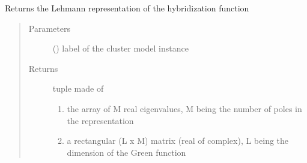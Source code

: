 \documentclass[letterpaper,10pt,english]{sphinxmanual}
\begin{document}

\begin{fulllineitems}
\label{\detokenize{functions:pyqcm.hybridization_Lehmann}}
\sphinxAtStartPar
Returns the Lehmann representation of the hybridization function
\begin{quote}\begin{description}
\item[{Parameters}] \leavevmode
\sphinxAtStartPar
{} () \textendash{} label of the cluster model instance

\item[{Returns}] \leavevmode
\sphinxAtStartPar

\sphinxhyphen{}tuple made of
\begin{enumerate}
%
\item {} 
\sphinxAtStartPar
the array of M real eigenvalues, M being the number of poles in the representation

\item {} 
\sphinxAtStartPar
a rectangular (L x M) matrix (real of complex), L being the dimension of the Green function

\end{enumerate}


\end{description}\end{quote}

\end{fulllineitems}

\end{document}
